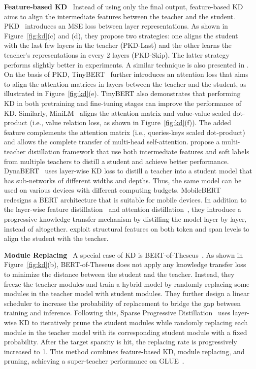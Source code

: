 \documentclass[letterpaper]{article} %
\newcommand{\ie}{i.e.,\xspace}
\newcommand{\paratitle}[1]{\noindent\textbf{#1}\ }
\begin{document}
\paratitle{Feature-based KD}
Instead of using only the final output, feature-based KD aims to align the intermediate features between the teacher and the student. PKD~\citep{pkd} introduces an MSE loss between layer representations. As shown in Figure~\ref{fig:kd}(c) and (d), they propose two strategies: one aligns the student with the last few layers in the teacher (PKD-Last) and the other learns the teacher's representations in every 2 layers (PKD-Skip). The latter strategy performs slightly better in experiments. A similar technique is also presented in \citet{aguilar2020knowledge}.
On the basis of PKD, TinyBERT~\citep{tinybert} further introduces an attention loss that aims to align the attention matrices in layers between the teacher and the student, as illustrated in Figure~\ref{fig:kd}(e). TinyBERT also demonstrates that performing KD in both pretraining and fine-tuning stages can improve the performance of KD.
Similarly, MiniLM~\citep{minilm,minilmv2} aligns the attention matrix and value-value scaled dot-product (\ie value relation loss, as shown in Figure~\ref{fig:kd}(f)). The added feature complements the attention matrix (\ie queries-keys scaled dot-product) and allows the complete transfer of multi-head self-attention.
\citet{wu2021one} propose a multi-teacher distillation framework that use both intermediate features and soft labels from multiple teachers to distill a student and achieve better performance.
DynaBERT~\citep{dynabert} uses layer-wise KD loss to distill a teacher into a student model that has sub-networks of different widths and depths. Thus, the same model can be used on various devices with different computing budgets.
MobileBERT~\citep{mobilebert} redesigns a BERT architecture that is suitable for mobile devices. In addition to the layer-wise feature distillation~\citep{pkd} and attention distillation~\citep{tinybert}, they introduce a progressive knowledge transfer mechanism by distilling the model layer by layer, instead of altogether. \citet{liu2022multi} exploit structural features on both token and span levels to align the student with the teacher.

\paratitle{Module Replacing} A special case of KD is BERT-of-Theseus~\citep{bot}. As shown in Figure~\ref{fig:kd}(b), BERT-of-Theseus does not apply any knowledge transfer loss to minimize the distance between the student and the teacher. Instead, they freeze the teacher modules and train a hybrid model by randomly replacing some modules in the teacher model with student modules. They further design a linear scheduler to increase the probability of replacement to bridge the gap between training and inference. Following this, Sparse Progressive Distillation~\citep{huang2022sparse} uses layer-wise KD to iteratively prune the student modules while randomly replacing each module in the teacher model with its corresponding student module with a fixed probability. After the target sparsity is hit, the replacing rate is progressively increased to 1. This method combines feature-based KD, module replacing, and pruning, achieving a super-teacher performance on GLUE~\citep{glue}.
\end{document}
